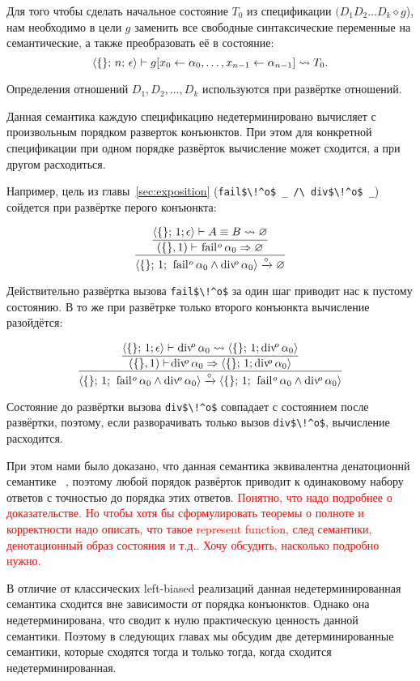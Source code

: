 Для того чтобы сделать начальное состояние $T_0$ из спецификации $(D_1 D_2\ldots D_k \diamond g$), нам необходимо в цели $g$ заменить все свободные синтаксические переменные на семантические, а также преобразовать её в состояние:
\[
{\langle \{\};\, n;\, \epsilon \rangle \vdash g[x_0 \leftarrow \alpha_0, \ldots, x_{n-1} \leftarrow \alpha_{n-1}]} \leadsto T_0.
\]

\noindent Определения отношений $D_1, D_2, \ldots, D_k$ используются при развёртке отношений.

Данная семантика каждую спецификацию недетерминировано вычисляет с произвольным порядком разверток конъюнктов. При этом для конкретной спецификации при одном порядке развёрток вычисление может сходится, а при другом расходиться. 

Например, цель из главы~\ref{sec:exposition} (\lstinline|fail$\!^o$ _ /\ div$\!^o$ _|) сойдется при развёртке перого конъюнкта:

\[
\dfrac
{\dfrac
{\inbr{\{\}; \, 1; \epsilon} \vdash A \equiv B \leadsto \emptyset}
{(\{\}, 1) \vdash\! \mbox{\lstinline|fail|}\!^o\, \alpha_0  \Rightarrow \emptyset}}
{\inbr{\{\}; \, 1; \, \mbox{\lstinline|fail|}\!^o\, \alpha_0 \land \mbox{\lstinline|div|}\!^o\, \alpha_0} \xrightarrow{\circ} \emptyset}
\]

\noindent Действительно развёртка вызова \lstinline|fail$\!^o$| за один шаг приводит нас к пустому состоянию. В то же при развётрке только второго конъюнкта вычисление разойдётся:

\[
\dfrac
{\dfrac
{\inbr{\{\}; \, 1; \epsilon} \vdash \mbox{\lstinline|div|}\!^o\, \alpha_0 \leadsto \inbr{\{\}; \, 1; \mbox{\lstinline|div|}\!^o\, \alpha_0}}
{(\{\}, 1) \vdash\! \mbox{\lstinline|div|}\!^o\, \alpha_0  \Rightarrow \inbr{\{\}; \, 1; \mbox{\lstinline|div|}\!^o\, \alpha_0}}}
{\inbr{\{\}; \, 1; \, \mbox{\lstinline|fail|}\!^o\, \alpha_0 \land \mbox{\lstinline|div|}\!^o\, \alpha_0} \xrightarrow{\circ} \inbr{\{\}; \, 1; \, \mbox{\lstinline|fail|}\!^o\, \alpha_0 \land \mbox{\lstinline|div|}\!^o\, \alpha_0}}
\]

\noindent Состояние до развёртки вызова \lstinline|div$\!^o$| совпадает с состоянием после развёртки, поэтому, если разворачивать только вызов \lstinline|div$\!^o$|, вычисление расходится.

При этом нами было доказано, что данная семантика эквивалентна денатоционнй семантике \mk~\cite{fair:semantics}, поэтому любой порядок развёрток приводит к одинаковому набору ответов с точностью до порядка этих ответов.
\textcolor{red}{Понятно, что надо подробнее о доказательстве. Но чтобы хотя бы сформулировать теоремы о полноте и корректности надо описать, что такое represent function, след семантики, денотационный образ состояния и т.д.. Хочу обсудить, насколько подробно нужно.}

В отличие от классических left-biased реализаций \mk данная недетерминированная семантика сходится вне зависимости от порядка конъюнктов. Однако она недетерминирована, что сводит к нулю практическую ценность данной семантики. Поэтому в следующих главах мы обсудим две детерминированные семантики, которые сходятся тогда и только тогда, когда сходится недетерминированная.

